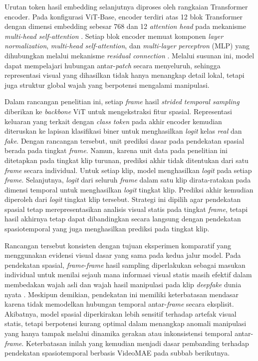 Urutan token hasil embedding selanjutnya diproses oleh rangkaian Transformer encoder. Pada konfigurasi ViT-Base, encoder terdiri atas 12 blok Transformer dengan dimensi embedding sebesar 768 dan 12 \textit{attention head} pada mekanisme \textit{multi-head self-attention} \cite{dosovitskiy2021imageworth16x16words}. Setiap blok encoder memuat komponen \textit{layer normalization}, \textit{multi-head self-attention}, dan \textit{multi-layer perceptron} (MLP) yang dihubungkan melalui mekanisme \textit{residual connection} \cite{dosovitskiy2021imageworth16x16words}. Melalui susunan ini, model dapat mempelajari hubungan antar-\textit{patch} secara menyeluruh, sehingga representasi visual yang dihasilkan tidak hanya menangkap detail lokal, tetapi juga struktur global wajah yang berpotensi mengalami manipulasi. \par

Dalam rancangan penelitian ini, setiap \textit{frame} hasil \textit{strided temporal sampling} diberikan ke \textit{backbone} ViT untuk mengekstraksi fitur spasial. Representasi keluaran yang terkait dengan \textit{class token} pada akhir encoder kemudian diteruskan ke lapisan klasifikasi biner untuk menghasilkan \textit{logit} kelas \textit{real} dan \textit{fake}. Dengan rancangan tersebut, unit prediksi dasar pada pendekatan spasial berada pada tingkat \textit{frame}. Namun, karena unit data pada penelitian ini ditetapkan pada tingkat klip turunan, prediksi akhir tidak ditentukan dari satu \textit{frame} secara individual. Untuk setiap klip, model menghasilkan \textit{logit} pada setiap \textit{frame}. Selanjutnya, \textit{logit} dari seluruh \textit{frame} dalam satu klip dirata-ratakan pada dimensi temporal untuk menghasilkan \textit{logit} tingkat klip. Prediksi akhir kemudian diperoleh dari \textit{logit} tingkat klip tersebut. Strategi ini dipilih agar pendekatan spasial tetap merepresentasikan analisis visual statis pada tingkat \textit{frame}, tetapi hasil akhirnya tetap dapat dibandingkan secara langsung dengan pendekatan spasiotemporal yang juga menghasilkan prediksi pada tingkat klip. \par

Rancangan tersebut konsisten dengan tujuan eksperimen komparatif yang menggunakan evidensi visual dasar yang sama pada kedua jalur model. Pada pendekatan spasial, \textit{frame}-\textit{frame} hasil sampling diperlakukan sebagai masukan individual untuk menilai sejauh mana informasi visual statis masih efektif dalam membedakan wajah asli dan wajah hasil manipulasi pada klip \textit{deepfake} dunia nyata \cite{Zi2024}\cite{chu2025reducedspatialdependencygeneral}. Meskipun demikian, pendekatan ini memiliki keterbatasan mendasar karena tidak memodelkan hubungan temporal antar-\textit{frame} secara eksplisit. Akibatnya, model spasial diperkirakan lebih sensitif terhadap artefak visual statis, tetapi berpotensi kurang optimal dalam menangkap anomali manipulasi yang hanya tampak melalui dinamika gerakan atau inkonsistensi temporal antar-\textit{frame}. Keterbatasan inilah yang kemudian menjadi dasar pembanding terhadap pendekatan spasiotemporal berbasis VideoMAE pada subbab berikutnya. \par

